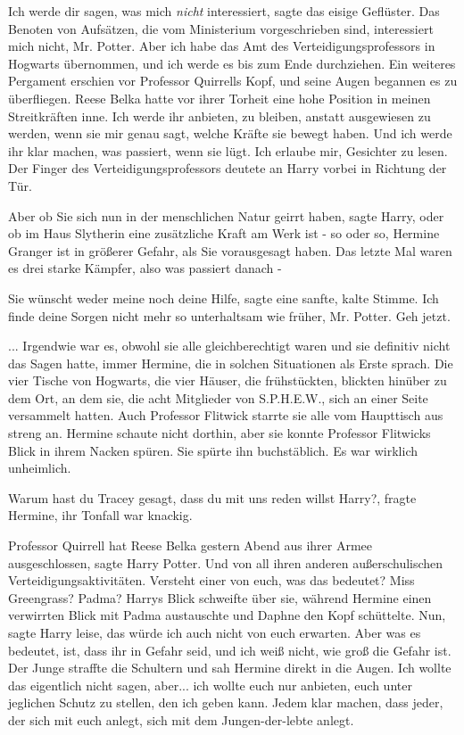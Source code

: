 \glqq Ich werde dir sagen, was mich \emph{nicht} interessiert\grqq{}, sagte das
eisige Geflüster. \glqq Das Benoten von Aufsätzen, die vom Ministerium
vorgeschrieben sind, interessiert mich nicht, Mr. Potter. Aber ich habe das Amt
des Verteidigungsprofessors in Hogwarts übernommen, und ich werde es bis zum
Ende durchziehen.\grqq{} Ein weiteres Pergament erschien vor Professor Quirrells
Kopf, und seine Augen begannen es zu überfliegen. \glqq Reese Belka hatte vor
ihrer Torheit eine hohe Position in meinen Streitkräften inne. Ich werde ihr
anbieten, zu bleiben, anstatt ausgewiesen zu werden, wenn sie mir genau sagt,
welche Kräfte sie bewegt haben. Und ich werde ihr klar machen, was passiert,
wenn sie lügt. Ich erlaube mir, Gesichter zu lesen.\grqq{} Der Finger des
Verteidigungsprofessors deutete an Harry vorbei in Richtung der Tür.

\glqq Aber ob Sie sich nun in der menschlichen Natur geirrt haben\grqq{}, sagte
Harry, \glqq oder ob im Haus Slytherin eine zusätzliche Kraft am Werk ist - so
oder so, Hermine Granger ist in größerer Gefahr, als Sie vorausgesagt haben. Das
letzte Mal waren es drei starke Kämpfer, also was passiert danach -\grqq{}

\glqq Sie wünscht weder meine noch deine Hilfe\grqq{}, sagte eine sanfte, kalte
Stimme. \glqq Ich finde deine Sorgen nicht mehr so unterhaltsam wie früher, Mr.
Potter. Geh jetzt.\grqq{}

... Irgendwie war es, obwohl sie alle gleichberechtigt waren und sie definitiv
nicht das Sagen hatte, immer Hermine, die in solchen Situationen als Erste
sprach. Die vier Tische von Hogwarts, die vier Häuser, die frühstückten,
blickten hinüber zu dem Ort, an dem sie, die acht Mitglieder von S.P.H.E.W.,
sich an einer Seite versammelt hatten. Auch Professor Flitwick starrte sie alle
vom Haupttisch aus streng an. Hermine schaute nicht dorthin, aber sie konnte
Professor Flitwicks Blick in ihrem Nacken spüren. Sie spürte ihn buchstäblich.
Es war wirklich unheimlich.

\glqq Warum hast du Tracey gesagt, dass du mit uns reden willst Harry?\grqq{},
fragte Hermine, ihr Tonfall war knackig.

\glqq Professor Quirrell hat Reese Belka gestern Abend aus ihrer Armee
ausgeschlossen\grqq{}, sagte Harry Potter. \glqq Und von all ihren anderen
außerschulischen Verteidigungsaktivitäten. Versteht einer von euch, was das
bedeutet? Miss Greengrass? Padma?\grqq{} Harrys Blick schweifte über sie,
während Hermine einen verwirrten Blick mit Padma austauschte und Daphne den Kopf
schüttelte. \glqq Nun\grqq{}, sagte Harry leise, \glqq das würde ich auch nicht
von euch erwarten. Aber was es bedeutet, ist, dass ihr in Gefahr seid, und ich
weiß nicht, wie groß die Gefahr ist.\grqq{} Der Junge straffte die Schultern und
sah Hermine direkt in die Augen. \glqq Ich wollte das eigentlich nicht sagen,
aber... ich wollte euch nur anbieten, euch unter jeglichen Schutz zu stellen,
den ich geben kann. Jedem klar machen, dass jeder, der sich mit euch anlegt,
sich mit dem Jungen-der-lebte anlegt.\grqq{}

